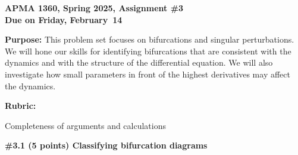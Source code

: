 \documentclass[10pt]{article}
\begin{document}
\begin{center}
    \bf
    APMA 1360, Spring 2025, Assignment \#3\\
    Due on Friday, February~14
\end{center}

\underline{\hspace*{\textwidth}}


\textbf{Purpose:} This problem set focuses on bifurcations and singular perturbations. We will hone our skills for identifying bifurcations that are consistent with the dynamics and with the structure of the differential equation. We will also investigate how small parameters in front of the highest derivatives may affect the dynamics.

\textbf{Rubric:}
\begin{compactitem}
    \item Completeness of arguments and calculations
\end{compactitem}

\underline{\hspace*{\textwidth}}


\textbf{\#3.1 (5 points) Classifying bifurcation diagrams}
\end{document}
